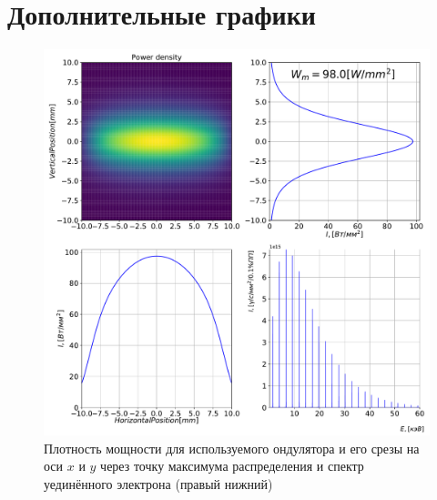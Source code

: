 \chapter{Дополнительные графики} \label{AppendixA}
\begin{figure}[h!]
	\centering  
	\includegraphics[width=\textwidth]{pic/power_dens_1-1.pdf}
	\caption{Плотность мощности для используемого ондулятора и его срезы на оси $x$ и $y$ через точку максимума распределения и спектр уединённого электрона (правый нижний)}
	\label{fig:power_dens_1-1}  
\end{figure}

